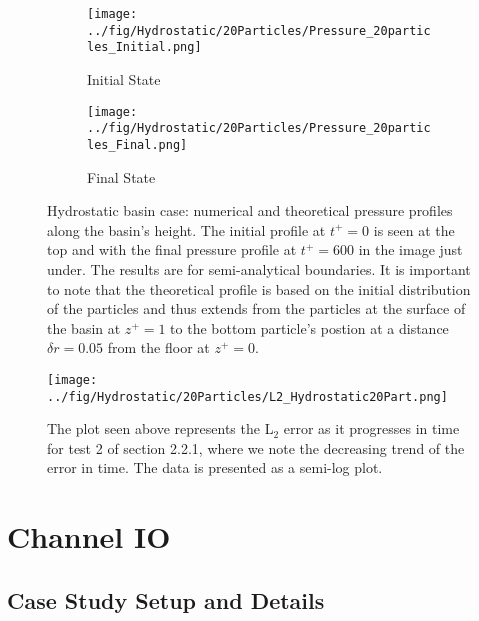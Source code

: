 \documentclass{../GPUSPHtemplate}
\begin{document}
\begin{figure}[H]
  \begin{subfigure}{.5\textwidth}
    \centering
    \texttt{[image: ../fig/Hydrostatic/20Particles/Pressure\_20particles\_Initial.png]}
    \vspace*{5pt}
    \caption{Initial State}
  \end{subfigure}%
  \begin{subfigure}{.5\textwidth}
    \centering 
    \texttt{[image: ../fig/Hydrostatic/20Particles/Pressure\_20particles\_Final.png]}
    \caption{Final State}        
  \end{subfigure}
  \caption{Hydrostatic basin case: numerical and theoretical pressure profiles along the basin's height.
    The initial profile at $t^+=0$ is seen at the top and with the final pressure profile at $t^+=600$ in the image just under.
    The results are for semi-analytical boundaries. It is important to note that the theoretical profile is
    based on the initial distribution of the particles and thus extends from the particles at the surface of the
    basin at $z^+=1$ to the bottom particle's postion at a distance $\delta r = 0.05 $ from the floor at $z^+=0$. }
  \label{fig:HydroExp2}
\end{figure}

\begin{figure}[H]
  \centering
  \texttt{[image: ../fig/Hydrostatic/20Particles/L2\_Hydrostatic20Part.png]}
  \caption{The plot seen above represents the L$_2$ error as it progresses in time for test 2 of section 2.2.1, where we note the decreasing trend of the error in time. The data is presented as a semi-log plot. }
  \label{fig:HydroExp2L2}
\end{figure}

\section{Channel IO}

\subsection{Case Study Setup and Details}
   
\end{document}
